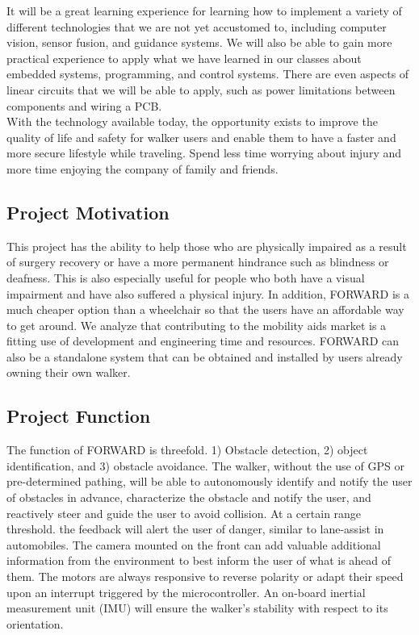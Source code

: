 \noindent It will be a great learning experience for learning how to implement a variety of different technologies that we are not yet accustomed to, including computer vision, sensor fusion, and guidance systems. We will also be able to gain more practical experience to apply what we have learned in our classes about embedded systems, programming, and control systems. There are even aspects of linear circuits that we will be able to apply, such as power limitations between components and wiring a PCB. \\

\noindent With the technology available today, the opportunity exists to improve the quality of life and safety for walker users and enable them to have a faster and more secure lifestyle while traveling. Spend less time worrying about injury and more time enjoying the company of family and friends. \\

\subsection{Project Motivation}
\indent This project has the ability to help those who are physically impaired as a result of surgery recovery or have a more permanent hindrance such as blindness or deafness. This is also especially useful for people who both have a visual impairment and have also suffered a physical injury. In addition, FORWARD is a much cheaper option than a wheelchair so that the users have an affordable way to get around. We analyze that contributing to the mobility aids market is a fitting use of development and engineering time and resources. FORWARD can also be a standalone system that can be obtained and installed by users already owning their own walker. \\

\subsection{Project Function}
\indent The function of FORWARD is threefold. 1) Obstacle detection, 2) object identification, and 3) obstacle avoidance. The walker, without the use of GPS or pre-determined pathing, will be able to autonomously identify and notify the user of obstacles in advance, characterize the obstacle and notify the user, and reactively steer and guide the user to avoid collision. At a certain range threshold. the feedback will alert the user of danger, similar to lane-assist in automobiles. The camera mounted on the front can add valuable additional information from the environment to best inform the user of what is ahead of them. The motors are always responsive to reverse polarity or adapt their speed upon an interrupt triggered by the microcontroller. An on-board inertial measurement unit (IMU) will ensure the walker’s stability with respect to its orientation.\\

